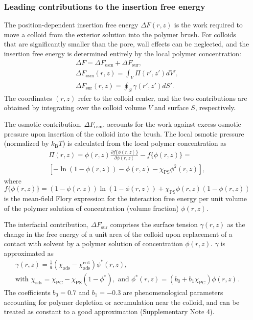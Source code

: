\documentclass[12pt, a4paper]{article}
\begin{document}
\subsubsection{Leading contributions to the insertion free energy}

The position-dependent insertion free energy $\Delta F(r,z)$ is the work required to move a colloid from the exterior solution into the polymer brush.
For colloids that are significantly smaller than the pore, wall effects can be neglected, and the insertion free energy is determined entirely by the local polymer concentration:
\begin{eqnarray}
    \Delta F = \Delta F_{\text{osm}} + \Delta F_{\text{sur}},
    \label{eq:Delta_F}
    \\
    \Delta F_{\text{osm}}(r,z) = \int_{V} \Pi(r',z') dV', \nonumber
    \\
    \Delta F_{\text{sur}}(r,z) = \oint_{S} \gamma (r',z') dS'. \nonumber
\end{eqnarray}
The coordinates $(r,z)$ refer to the colloid center, and the two contributions are obtained by integrating over the colloid volume $V$ and surface $S$, respectively.

The osmotic contribution, $\Delta F_{\text{osm}}$, accounts for the work against excess osmotic pressure upon insertion of the colloid into the brush.
The local osmotic pressure (normalized by $k_\text{B} T$) is calculated from the local polymer concentration as
\begin{equation}
    \begin{aligned}
        \Pi(r,z)=  \phi(r,z)\frac{\partial f\{\phi(r,z)\}}{\partial \phi(r,z)} - f\{\phi(r,z)\}= 
        \\
        [-\ln(1-\phi(r,z)) - \phi(r,z) -\chi_{\text{PS}}\phi^2(r,z)],
    \end{aligned}
    \label{eq:osmotic}
\end{equation}
where 
$$
f\{\phi(r,z)\}=(1-\phi(r,z))\ln(1-\phi(r,z)) +\chi_{\text{PS}}\phi(r,z)(1-\phi(r,z))
$$
is the mean-field Flory expression for the interaction free energy per unit volume of the polymer solution of concentration (volume fraction) $\phi(r,z)$.

The interfacial contribution, $\Delta F_{\text{sur}}$ comprises the surface tension $\gamma (r,z)$ as the change in the free energy of a unit area of the colloid upon replacement of a contact with solvent by a polymer solution of concentration $\phi(r,z)$. $\gamma$ is approximated as
\begin{gather}
     \gamma (r,z)= \frac{1}{6}(\chi_{\text{ads}} - \chi_{\text{ads}}^{\text{crit}})\phi^{\ast}(r,z),
    \label{eq:chi_ads} 
    \\
    \text{with } \chi_{\text{ads}} = \chi_{\text{PC}} - \chi_{\text{PS}}(1-\phi^{\ast}), \text{ and } \phi^{\ast}(r,z)= (b_{0} + b_{1}\chi_{\text{PC}})\phi(r,z).
    \nonumber
\end{gather}
The coefficients $b_0 = 0.7$ and $b_1 = -0.3$ are phenomenological parameters accounting for polymer depletion or accumulation near the colloid, and can be treated as constant to a good approximation (Supplementary Note 4).
\end{document}
